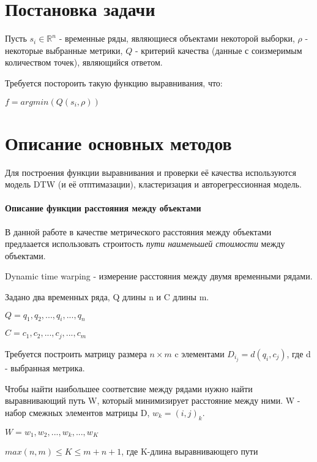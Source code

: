 \documentclass[12pt,twoside]{article}
\begin{document}
				
				
    \section{Постановка задачи}
		
				Пусть $s_i \in \mathbb{R}^n $ - временные ряды, являющиеся объектами некоторой выборки, $\rho$ - некоторые выбранные метрики, $Q$ - критерий качества (данные с соизмеримым количеством точек), являющийся ответом.
				
				Требуется постороить такую функцию выравнивания, что:
				
				$ f = argmin(Q(s_i, \rho))$
				
				\section{Описание основных методов}
				
				Для построения функции выравнивания и проверки её качества используются модель DTW (и её отптимазации), кластеризация и авторегрессионная модель.
				
				\paragraph{Описание функции расстояния между объектами}
				
				В данной работе в качестве метрического расстояния между объектами предлаается использовать строитость \textit{пути наименьшей стоимости} между объектами.
				
				Dynamic time warping - измерение расстояния между двумя временными рядами.
				
				Задано два временных ряда, Q длины n и C длины m.
				
				$Q=q_1,q_2, ..., q_i, ..., q_n $
				
				$C=c_1,c_2, ..., c_j, ..., c_m $
				
				Требуется построить матрицу размера $n\times m$ c элементами $D_i_j=d(q_i, c_j)$, где d - выбранная метрика.
				
				Чтобы найти наибольшее соответсвие между рядами нужно найти выравнивающий путь W, который минимизирует расстояние между ними. W - набор смежных элементов матрицы D, $w_k = (i, j)_k$.
				
				$W = w_1,w_2, ..., w_k, ..., w_K $

				$max(n, m)\leq K \leq m+n+1$, где K-длина выравнивающего пути
				
\end{document}
